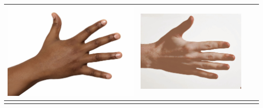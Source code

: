 \begin{longtable}{|N||c|c|c|}
\begin{minipage}{.29\textwidth}
    \includegraphics[width=\textwidth,height=\textheight,keepaspectratio]{../inputs/hand_dark.jpg}
  \end{minipage} & 
  \begin{minipage}{.29\textwidth}
    \includegraphics[width=\textwidth,height=\textheight,keepaspectratio]{../rc_test/outputs/20170517_proportional_corrected_test_alpha10/hand_pale_to_hand_dark.jpg}
  \end{minipage} \\
\hline  \label{row:prop_correct_test_a10_hand_pale_to_hand_brown} &
  \begin{minipage}{.29\textwidth}

\end{minipage}
\end{longtable}
